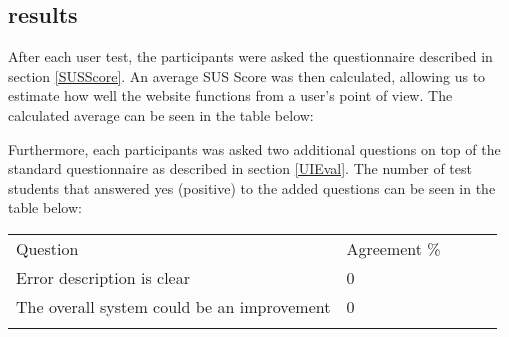 

\subsection*{results}
After each user test, the participants were asked the questionnaire described in section \ref{SUSScore}. An average SUS Score was then calculated, allowing us to estimate how well the website functions from a user’s point of view. The calculated average can be seen in the table below:


Furthermore, each participants was asked two additional questions on top of the standard questionnaire as described in section \ref{UIEval}. The number of test students that answered yes (positive) to the added questions can be seen in the table below:

\begin{table}[]
\begin{tabular}{lllll}
\cline{1-2}
\multicolumn{1}{|l|}{\cellcolor[HTML]{C0C0C0}Question}           & \multicolumn{1}{l|}{\cellcolor[HTML]{C0C0C0}Agreement \%} &  &  &  \\ \cline{1-2}
\multicolumn{1}{|l|}{Error description is clear}                 & \multicolumn{1}{l|}{0}                                    &  &  &  \\ \cline{1-2}
\multicolumn{1}{|l|}{The overall system could be an improvement} & \multicolumn{1}{l|}{0}                                    &  &  &  \\ \cline{1-2}
                                                                 &                                                           &  &  & 
\end{tabular}
\end{table}

